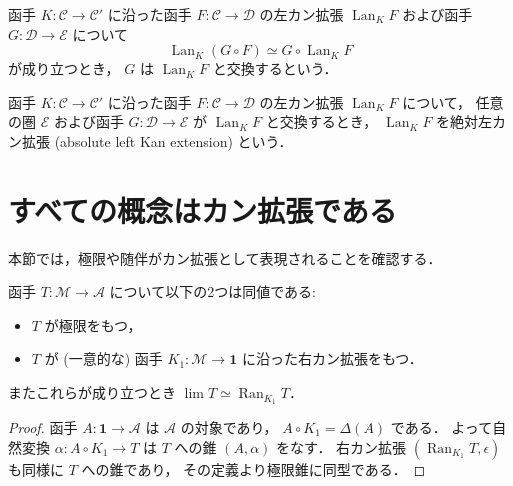 \documentclass[titlepage]{ltjsreport}
\newcommand{\cat}[1]{\mathscr{#1}}
\newcommand{\mrp}[3]{{#1}:{#2}\to{#3}}
\DeclareMathOperator{\lan}{Lan}
\DeclareMathOperator{\ran}{Ran}
\begin{document}
{
  \def\C{\cat{C}}%
  \def\A{\cat{C'}}%
  \def\D{\cat{D}}%
  \def\E{\cat{E}}%
  \def\K{K}%
  \def\F{F}%
  \def\G{G}%
  \begin{definition}[函手と左カン拡張の交換]
    函手 $\mrp{\K}{\C}{\A}$ に沿った函手 $\mrp{\F}{\C}{\D}$ の左カン拡張
    $\lan_{\K}\F$ および函手 $\mrp{\G}{\D}{\E}$ について
    \begin{equation}
      \lan_{\K}(\G\circ\F)\simeq\G\circ\lan_{\K}\F
    \end{equation}
    が成り立つとき，
    $\G$ は $\lan_{\K}\F$ と交換するという．
  \end{definition}
  \begin{definition}[絶対左カン拡張]
    函手 $\mrp{\K}{\C}{\A}$ に沿った函手 $\mrp{\F}{\C}{\D}$ の左カン拡張
    $\lan_{\K}\F$ について，
    任意の圏 $\E$ および函手 $\mrp{\G}{\D}{\E}$ が
    $\lan_{\K}\F$ と交換するとき，
    $\lan_{\K}\F$ を絶対左カン拡張 (absolute left Kan extension) という．
  \end{definition}
}

\section{すべての概念はカン拡張である}

本節では，極限や随伴がカン拡張として表現されることを確認する．

\begin{theorem}[極限は右カン拡張である]\label{thm:limit-is-right-kan-extension}
  函手 $T:\cat{M}\to\cat{A}$ について以下の2つは同値である:
  \begin{itemize}
    \item $T$ が極限をもつ，
    \item $T$ が (一意的な) 函手 $K_1:\cat{M}\to\mathbf{1}$
          に沿った右カン拡張をもつ．
  \end{itemize}
  またこれらが成り立つとき $\lim T\simeq\ran_{K_1}T$．
\end{theorem}

\begin{proof}
  函手 $A:\mathbf{1}\to\cat{A}$ は $\cat{A}$ の対象であり，
  $A\circ K_1=\Delta(A)$ である．
  よって自然変換 $\alpha:A\circ K_1\to T$ は $T$ への錐 $(A,\alpha)$ をなす．
  右カン拡張 $(\ran_{K_1}T,\epsilon)$ も同様に $T$ への錐であり，
  その定義より極限錐に同型である．
\end{proof}
\end{document}
